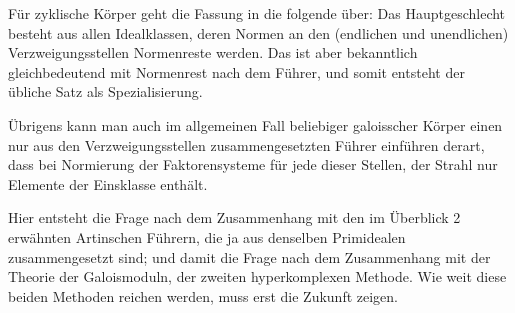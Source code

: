 Für zyklische Körper geht die Fassung in die folgende über: Das Hauptgeschlecht besteht aus allen Idealklassen, deren Normen an den (endlichen und unendlichen) Verzweigungsstellen Normenreste werden. Das ist aber bekanntlich gleichbedeutend mit \glqq{}Normenrest nach dem Führer\grqq{}, und somit entsteht der übliche Satz als Spezialisierung.

Übrigens kann man auch im allgemeinen Fall beliebiger galoisscher Körper einen nur aus den Verzweigungsstellen zusammengesetzten Führer einführen derart, dass bei Normierung der Faktorensysteme für jede dieser Stellen, der Strahl nur Elemente der Einsklasse enthält.

Hier entsteht die Frage nach dem Zusammenhang mit den im Überblick 2 erwähnten Artinschen Führern, die ja aus denselben Primidealen zusammengesetzt sind; und damit die Frage nach dem Zusammenhang mit der Theorie der Galoismoduln, der zweiten hyperkomplexen Methode. Wie weit diese beiden Methoden reichen werden, muss erst die Zukunft zeigen.


\clearpage
\setcounter{footnote}{0}

